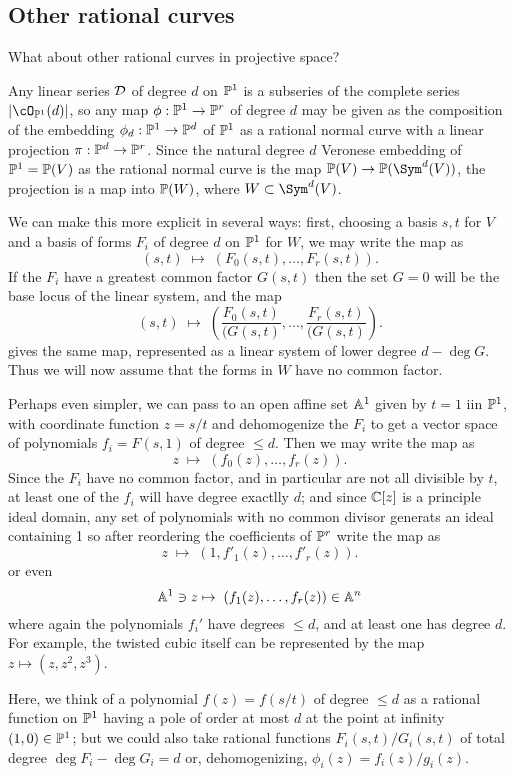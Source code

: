 \subsection{Other rational curves}

What about other rational curves in projective space? 

Any linear series $\cD$ of degree $d$ on $\PP^1$ is a subseries of the complete series $|\cO_{\PP^1}(d)|$, so any map $\phi : \PP^1 \to \PP^r$ of degree $d$ may be given as the
composition of the embedding $\phi_d : \PP^1 \to \PP^d$ of $\PP^1$ as a rational normal curve with a linear projection $\pi : \PP^d \to \PP^r$. Since the natural degree $d$ Veronese embedding of $\PP^1 = \PP(V)$ as the rational normal curve is the map
$\PP(V) \to \PP(\Sym^d(V))$, the projection is a map into $\PP(W)$, where $W\subset \Sym^d(V)$. 

We can make this more explicit in several ways: first, choosing a basis $s,t$ for $V$ and a basis of forms $F_i$ of degree $d$ on $\PP^1$ for $W$, we may write the map as
$$
(s,t) \; \mapsto \; (F_0(s,t), \dots, F_r(s,t)).
$$
If the $F_i$ have a greatest common factor $G(s,t)$ then the set $G=0$ will be the base locus
of the linear system, and the map
$$
(s,t) \; \mapsto \; ( \frac{F_0(s,t)}{(G(s,t)}, \dots, \frac{F_r(s,t)}{(G(s,t)}).
$$
gives the same map, represented as a linear system of lower degree $d-\deg G$. Thus we
will now assume that the forms in $W$ have no common factor.

Perhaps even simpler, we can pass to an open affine set $\AA^1$ given by $t=1$ iin $\PP^1$, with coordinate function $z = s/t$ and
dehomogenize the $F_i$ to get a vector space of polynomials $f_i = F(s,1)$ of degree $\leq d$. Then we may write the
map as
$$
z \; \mapsto \; (f_0(z), \dots, f_r(z)).
$$
Since the $F_i$ have no common factor, and in particular are not all divisible by $t$, at least one of the
$f_i$ will have degree exactlly $d$; and since $\CC[z]$ is a principle ideal domain, any set of 
polynomials with no common divisor generats an ideal containing 
1 so after reordering the coefficients of $\PP^r$ write the map as
$$
z \; \mapsto \; (1, f'_1(z), \dots, f'_r(z)).
$$
or even
$$
\AA^1 \ni z \mapsto \; (f_1(z), \dots, f_r(z))\in \AA^n
$$
where again the polynomials $f_i'$ have degrees $\leq d$, and at least one has degree $d$.
For example, the twisted cubic itself can be represented by the map
$z \mapsto (z,z^2,z^3)$.

Here, we think of a polynomial $f(z) = f(s/t)$ of degree $\leq d$ as a rational function on $\PP^1$ having
a pole of order at most $d$ at the point at infinity $(1,0)\in \PP^1$; but we could also take rational
functions $F_i(s,t)/G_i(s,t)$ of total degree $\deg F_i-\deg G_i = d$ or, dehomogenizing, $\phi_i(z) = f_i(z)/g_i(z)$.

